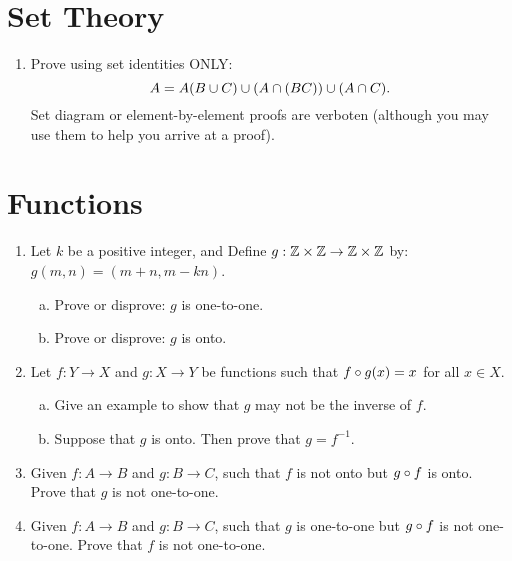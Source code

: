 \section{Set Theory}

\begin{enumerate}
\item
Prove using set identities ONLY:  
\[A = A\\(B\cup C) \cup (A\cap (B\\C)) \cup  (A \cap C).\]    
Set diagram or element-by-element proofs are verboten (although you may use them to help you arrive at a proof).

\end{enumerate}

\section{Functions}

\begin{enumerate}
\item
Let $k$ be a positive integer, and Define $g : \mathbb{Z} \times \mathbb{Z}  \rightarrow \mathbb{Z} \times \mathbb{Z}$ by: $g(m, n) = (m + n,  m - kn)$.
\begin{enumerate}[(a)]
\item
Prove or disprove:  $g$ is one-to-one.
\item
Prove or disprove:  $g$ is onto.
\end{enumerate}

\item
Let $ f:Y \rightarrow X$ and $g:X \rightarrow Y$ be functions   such that  $f \circ g(x) = x$ for all $x \in X$.
\begin{enumerate}[(a)]
\item
Give an example to show that $g$ may not be the inverse of $f$.
\item
Suppose that $g$ is onto. Then prove that $g = f^{-1}$.
\end{enumerate}

\item
Given $f : A \rightarrow B$ and $g : B \rightarrow C$, such that $f$  is not onto but  $g \circ f$  is onto. Prove that $g$ is not one-to-one.

\item
Given $f : A \rightarrow B$ and $g : B \rightarrow C$, such that $g$  is one-to-one  but  $g \circ f$  is not one-to-one. Prove that $f$ is not one-to-one.


\end{enumerate}

